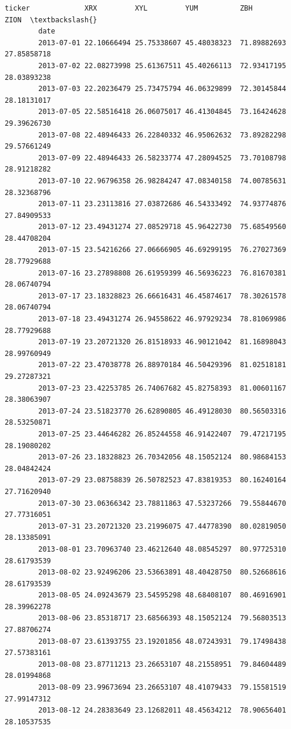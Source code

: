 \documentclass[11pt]{article}
\begin{document}
\begin{Verbatim}[commandchars=\\\{\}]
        ticker             XRX         XYL         YUM          ZBH        ZION  \textbackslash{}
        date                                                                      
        2013-07-01 22.10666494 25.75338607 45.48038323  71.89882693 27.85858718   
        2013-07-02 22.08273998 25.61367511 45.40266113  72.93417195 28.03893238   
        2013-07-03 22.20236479 25.73475794 46.06329899  72.30145844 28.18131017   
        2013-07-05 22.58516418 26.06075017 46.41304845  73.16424628 29.39626730   
        2013-07-08 22.48946433 26.22840332 46.95062632  73.89282298 29.57661249   
        2013-07-09 22.48946433 26.58233774 47.28094525  73.70108798 28.91218282   
        2013-07-10 22.96796358 26.98284247 47.08340158  74.00785631 28.32368796   
        2013-07-11 23.23113816 27.03872686 46.54333492  74.93774876 27.84909533   
        2013-07-12 23.49431274 27.08529718 45.96422730  75.68549560 28.44708204   
        2013-07-15 23.54216266 27.06666905 46.69299195  76.27027369 28.77929688   
        2013-07-16 23.27898808 26.61959399 46.56936223  76.81670381 28.06740794   
        2013-07-17 23.18328823 26.66616431 46.45874617  78.30261578 28.06740794   
        2013-07-18 23.49431274 26.94558622 46.97929234  78.81069986 28.77929688   
        2013-07-19 23.20721320 26.81518933 46.90121042  81.16898043 28.99760949   
        2013-07-22 23.47038778 26.88970184 46.50429396  81.02518181 29.27287321   
        2013-07-23 23.42253785 26.74067682 45.82758393  81.00601167 28.38063907   
        2013-07-24 23.51823770 26.62890805 46.49128030  80.56503316 28.53250871   
        2013-07-25 23.44646282 26.85244558 46.91422407  79.47217195 28.19080202   
        2013-07-26 23.18328823 26.70342056 48.15052124  80.98684153 28.04842424   
        2013-07-29 23.08758839 26.50782523 47.83819353  80.16240164 27.71620940   
        2013-07-30 23.06366342 23.78811863 47.53237266  79.55844670 27.77316051   
        2013-07-31 23.20721320 23.21996075 47.44778390  80.02819050 28.13385091   
        2013-08-01 23.70963740 23.46212640 48.08545297  80.97725310 28.61793539   
        2013-08-02 23.92496206 23.53663891 48.40428750  80.52668616 28.61793539   
        2013-08-05 24.09243679 23.54595298 48.68408107  80.46916901 28.39962278   
        2013-08-06 23.85318717 23.68566393 48.15052124  79.56803513 27.88706274   
        2013-08-07 23.61393755 23.19201856 48.07243931  79.17498438 27.57383161   
        2013-08-08 23.87711213 23.26653107 48.21558951  79.84604489 28.01994868   
        2013-08-09 23.99673694 23.26653107 48.41079433  79.15581519 27.99147312   
        2013-08-12 24.28383649 23.12682011 48.45634212  78.90656401 28.10537535   

\end{Verbatim}
\end{document}
